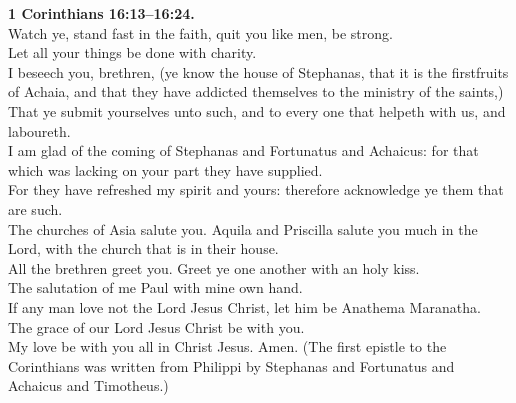 \documentclass[10pt]{article} %
\begin{document}
{\begin{minipage}[t]{0.45\textwidth}
\textbf{1 Corinthians 16:13--16:24.}\\
Watch ye, stand fast in the faith, quit you like men, be strong.\\
Let all your things be done with charity.\\
I beseech you, brethren, (ye know the house of Stephanas, that it is the firstfruits of Achaia, and that they have addicted themselves to the ministry of the saints,)\\
That ye submit yourselves unto such, and to every one that helpeth with us, and laboureth.\\
I am glad of the coming of Stephanas and Fortunatus and Achaicus: for that which was lacking on your part they have supplied.\\
For they have refreshed my spirit and yours: therefore acknowledge ye them that are such.\\
The churches of Asia salute you. Aquila and Priscilla salute you much in the Lord, with the church that is in their house.\\
All the brethren greet you. Greet ye one another with an holy kiss.\\
The salutation of me Paul with mine own hand.\\
If any man love not the Lord Jesus Christ, let him be Anathema Maranatha.\\
The grace of our Lord Jesus Christ be with you.\\
My love be with you all in Christ Jesus. Amen. (The first epistle to the Corinthians was written from Philippi by Stephanas and Fortunatus and Achaicus and Timotheus.)\\

\end{minipage}}
\vspace*{\fill}
\newpage
\Huge%
\vspace*{\fill}
\end{document}
